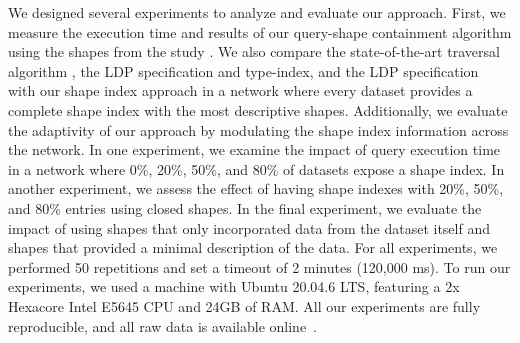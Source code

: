 
We designed several experiments to analyze and evaluate our approach.
First, we measure the execution time and results of our query-shape containment algorithm using the shapes from the study .
We also compare the state-of-the-art traversal algorithm , the LDP specification and type-index, and the LDP specification~\cite{Taelman2023} with our shape index approach in a network where every dataset provides a complete shape index with the most descriptive shapes.
Additionally, we evaluate the adaptivity of our approach by modulating the shape index information across the network.
In one experiment, we examine the impact of query execution time in a network where 0\%, 20\%, 50\%, and 80\% of datasets  expose a shape index.
In another experiment, we assess the effect of having shape indexes with 20\%, 50\%, and 80\% entries using closed shapes.
In the final experiment, we evaluate the impact of using shapes that only incorporated data from the dataset itself and shapes that provided a minimal description of the data.
For all experiments, we performed 50 repetitions and set a timeout of 2 minutes (120,000 ms).
To run our experiments, we used a machine with Ubuntu 20.04.6 LTS, featuring a 2x Hexacore Intel E5645 CPU and 24GB of RAM.
All our experiments are fully reproducible, and all raw data is available online~.

\iffalse
PROVIDE LINK FOR EXPERIMENTS AND SHAPES

102x pcgen3 nodes
https://doc.ilabt.imec.be/ilabt/virtualwall/hardware.html#virtual-wall-2
\fi
